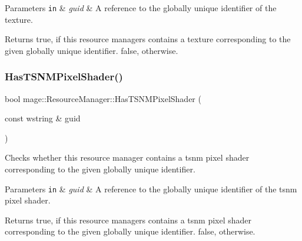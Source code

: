 \begin{DoxyParams}[1]{Parameters}
\mbox{\tt in}  & {\em guid} & A reference to the globally unique identifier of the texture. \\
\hline
\end{DoxyParams}
\begin{DoxyReturn}{Returns}
{\ttfamily true}, if this resource managers contains a texture corresponding to the given globally unique identifier. {\ttfamily false}, otherwise. 
\end{DoxyReturn}
\hypertarget{classmage_1_1_resource_manager_a3aeb6ce19c392b82fd4268525478fc3d}{}\label{classmage_1_1_resource_manager_a3aeb6ce19c392b82fd4268525478fc3d} 
\subsubsection{\texorpdfstring{Has\+T\+S\+N\+M\+Pixel\+Shader()}{HasTSNMPixelShader()}}
{\footnotesize\ttfamily bool mage\+::\+Resource\+Manager\+::\+Has\+T\+S\+N\+M\+Pixel\+Shader (\begin{DoxyParamCaption}\item[{const wstring \&}]{guid }\end{DoxyParamCaption})\hspace{0.3cm}{\ttfamily [noexcept]}}

Checks whether this resource manager contains a tsnm pixel shader corresponding to the given globally unique identifier.


\begin{DoxyParams}[1]{Parameters}
\mbox{\tt in}  & {\em guid} & A reference to the globally unique identifier of the tsnm pixel shader. \\
\hline
\end{DoxyParams}
\begin{DoxyReturn}{Returns}
{\ttfamily true}, if this resource managers contains a tsnm pixel shader corresponding to the given globally unique identifier. {\ttfamily false}, otherwise. 
\end{DoxyReturn}
\hypertarget{classmage_1_1_resource_manager_aaed0648fcca9ef8c5ea901adf8691eb2}{}\label{classmage_1_1_resource_manager_aaed0648fcca9ef8c5ea901adf8691eb2} 
